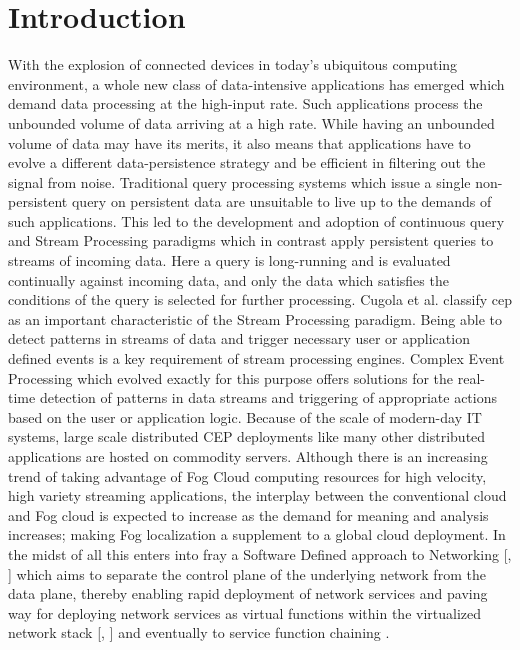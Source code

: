 \chapter{Introduction} 
With the explosion of connected devices in today's ubiquitous computing environment, a whole new class of data-intensive applications has emerged which demand data processing at the high-input rate. Such applications process the unbounded volume of data arriving at a high rate. While having an unbounded volume of data may have its merits, it also means that applications have to evolve a different data-persistence strategy and be efficient in filtering out the signal from noise. Traditional query processing systems which issue a single non-persistent query on persistent data are unsuitable to live up to the demands of such applications. This led to the development and adoption of continuous query \cite{Chen} and Stream Processing \cite{chakravarthy} paradigms which in contrast apply persistent queries to streams of incoming data. Here a query is long-running and is evaluated continually against incoming data, and only the data which satisfies the conditions of the query is selected for further processing. Cugola et al. \cite{cugola2012processing} classify \ac{cep} as an important characteristic of the Stream Processing paradigm. Being able to detect patterns in streams of data and trigger necessary user or application defined events is a key requirement of stream processing engines. Complex Event Processing which evolved exactly for this purpose offers solutions for the real-time detection of patterns in data streams and triggering of appropriate actions based on the user or application logic. 
\newline \newline
Because of the scale of modern-day IT systems, large scale distributed CEP deployments like many other distributed applications are hosted on commodity servers. Although there is an increasing trend of taking advantage of Fog Cloud computing resources \cite{bonomi2012fog} for high velocity, high variety streaming applications, the interplay between the conventional cloud and Fog cloud is expected to increase as the demand for meaning and analysis increases; making Fog localization a supplement to a global cloud deployment.  
In the midst of all this enters into fray a Software Defined approach to Networking [\cite{Jain}, \cite{casado}] which aims to separate the control plane of the underlying network from the data plane, thereby enabling rapid deployment of network services and paving way for deploying network services as virtual functions within the virtualized network stack [\cite{sherwood2009flowvisor},\cite{han2015network} ] and eventually to service function chaining \cite{halpern2015service}. 

